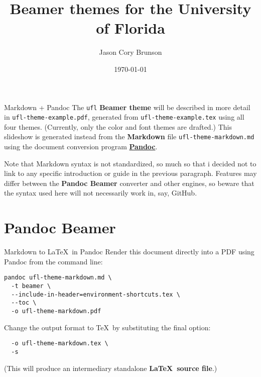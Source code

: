 \documentclass[
  ignorenonframetext,
  aspectratio=169,
]{beamer}
\title{Beamer themes for the University of Florida}
\author{Jason Cory Brunson}
\date{\today}
\institute{Laboratory for Systems Medicine, University of Florida}
\begin{document}
\frame{\titlepage}

\begin{frame}[allowframebreaks]
  \tableofcontents[hideallsubsections]
\end{frame}
\begin{frame}[fragile]{Markdown + Pandoc}
\protect\hypertarget{markdown-pandoc}{}
The \texttt{ufl} \textbf{Beamer theme} will be described in more detail
in \texttt{ufl-theme-example.pdf}, generated from
\texttt{ufl-theme-example.tex} using all four themes. (Currently, only
the color and font themes are drafted.) This slideshow is generated
instead from the \textbf{Markdown} file \texttt{ufl-theme-markdown.md}
using the document conversion program
\href{https://pandoc.org/}{\textbf{Pandoc}}.

Note that Markdown syntax is not standardized, so much so that i decided
not to link to any specific introduction or guide in the previous
paragraph. Features may differ between the \textbf{Pandoc Beamer}
converter and other engines, so beware that the syntax used here will
not necessarily work in, say, GitHub.
\end{frame}

\hypertarget{pandoc-beamer}{%
\section{Pandoc Beamer}\label{pandoc-beamer}}

\begin{frame}[fragile]{Markdown to \LaTeX~in Pandoc}
\protect\hypertarget{markdown-to-in-pandoc}{}
Render this document directly into a PDF using Pandoc from the command
line:

\begin{verbatim}
pandoc ufl-theme-markdown.md \
  -t beamer \
  --include-in-header=environment-shortcuts.tex \
  --toc \
  -o ufl-theme-markdown.pdf
\end{verbatim}

Change the output format to \TeX~by substituting the final option:

\begin{verbatim}
  -o ufl-theme-markdown.tex \
  -s
\end{verbatim}

(This will produce an intermediary standalone \textbf{\LaTeX~source
file}.)
\end{frame}
\end{document}
